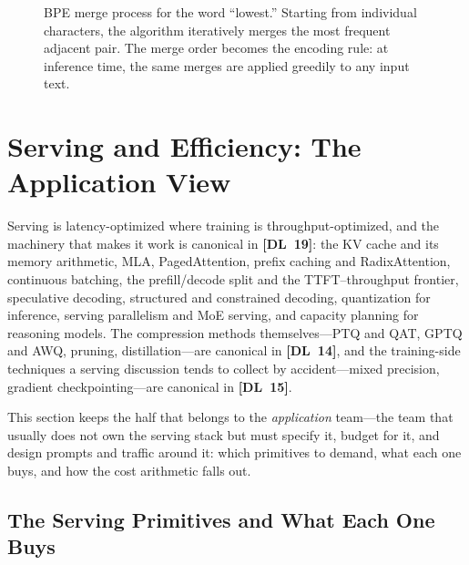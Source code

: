\begin{figure}[H]
\caption{BPE merge process for the word ``lowest.''  Starting from individual characters,
the algorithm iteratively merges the most frequent adjacent pair.  The merge order
becomes the encoding rule: at inference time, the same merges are applied greedily
to any input text.}
\label{fig:bpe_merge}
\end{figure}


\section{Serving and Efficiency: The Application View}
\label{sec:model_serving}

Serving is latency-optimized where training is throughput-optimized, and the
machinery that makes it work is canonical in \textbf{[DL~19]}: the KV cache
and its memory arithmetic, MLA, PagedAttention, prefix caching and
RadixAttention, continuous batching, the prefill/decode split and the
TTFT--throughput frontier, speculative decoding, structured and constrained
decoding, quantization for inference, serving parallelism and MoE serving,
and capacity planning for reasoning models.  The compression methods
themselves---PTQ and QAT, GPTQ and AWQ, pruning, distillation---are canonical
in \textbf{[DL~14]}, and the training-side techniques a serving discussion
tends to collect by accident---mixed precision, gradient checkpointing---are
canonical in \textbf{[DL~15]}.

This section keeps the half that belongs to the \emph{application} team---the
team that usually does not own the serving stack but must specify it, budget
for it, and design prompts and traffic around it: which primitives to demand,
what each one buys, and how the cost arithmetic falls out.

\subsection{The Serving Primitives and What Each One Buys}
\label{sec:kv_cache}
\label{sec:continuous_batching}
\label{sec:paged_attention}
\label{sec:prefix_caching}
\label{sec:parallelism}
\label{sec:speculative_decoding}

